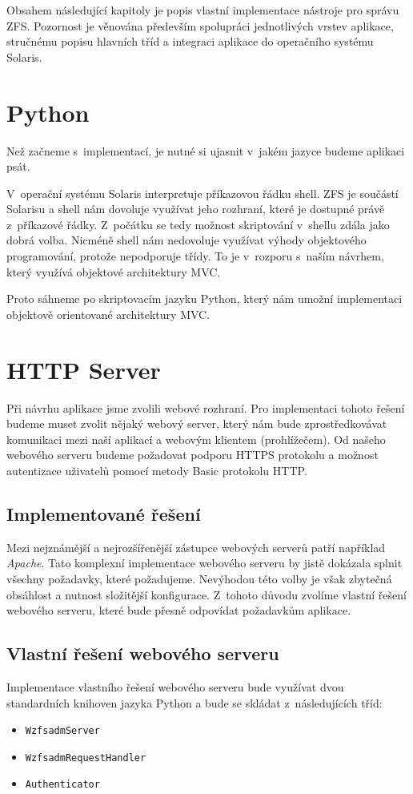 Obsahem následující kapitoly je popis vla\-stní implementace nástroje pro sprá\-vu ZFS. Pozornost je věnována především spolupráci jednotlivých vrstev aplikace, stručnému popisu hlavních tříd a integraci aplikace do operačního systému Solaris.
\section{Python}
Než začneme s~implementací, je nutné si ujasnit v~jakém jazyce budeme aplikaci psát.

V~operační systému Solaris interpretuje příkazovou řádku shell. ZFS je součástí Solarisu a shell nám dovoluje využívat jeho rozhraní, které je dostupné právě z~příkazové řádky. Z~počátku se tedy možnost skriptování v~shellu zdála jako dobrá volba. Nicméně shell nám nedovoluje využívat výhody objektového programování, protože nepodporuje třídy. To je v~rozporu s~naším návrhem, který využívá objektové architektury MVC.

Proto sáhneme po skriptovacím jazyku Python, který nám umožní implementaci objektově orientované architektury MVC.
\section{HTTP Server}
Při návrhu aplikace jsme zvolili webové rozhraní. Pro implementaci tohoto řešení budeme muset zvolit nějaký webový server, který nám bude zprostředkovávat komunikaci mezi naší aplikací a webovým klientem (prohlížečem). Od našeho webového serveru budeme požadovat podporu HTTPS protokolu a možnost autentizace uživatelů pomocí metody Basic protokolu HTTP.
    \subsection{Implementované řešení}
    Mezi nejznámější a nejrozšířenější zástupce webových serverů patří například \emph{Apache}. Tato komplexní implementace webového serveru by jistě dokázala splnit všechny požadavky, které požadujeme. Nevýhodou této volby je však zbytečná obsáhlost a nutnost složitější konfigurace. Z~tohoto důvodu zvolíme vlastní řešení webového serveru, které bude přesně odpovídat požadavkům aplikace.
    \subsection{Vlastní řešení webového serveru}
    Implementace vlastního řešení webového serveru bude využívat dvou standardních knihoven jazyka Python a bude se skládat z~následujících tříd:
    \begin{itemize}
      \item \verb|WzfsadmServer|
      \item \verb|WzfsadmRequestHandler|
      \item \verb|Authenticator|
    \end{itemize}

